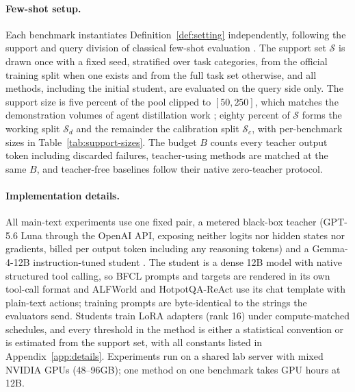 \paragraph{Few-shot setup.}
Each benchmark instantiates Definition~\ref{def:setting}
independently, following the support and query division of classical
few-shot evaluation \citep{vinyals2016matching, snell2017prototypical}.
The support set $\mathcal{S}$ is drawn once with a fixed seed,
stratified over task categories, from the official training split when
one exists and from the full task set otherwise, and all methods,
including the initial student, are evaluated on the query side only.
The support size is five percent of the pool clipped to $[50,250]$,
which matches the demonstration volumes of agent distillation work
\citep{kang2025distilling, liu2025structured}; eighty percent of
$\mathcal{S}$ forms the working split $\mathcal{S}_d$ and the
remainder the calibration split $\mathcal{S}_c$, with per-benchmark
sizes in Table~\ref{tab:support-sizes}. The budget $B$ counts every
teacher output token including discarded failures, teacher-using
methods are matched at the same $B$, and teacher-free baselines follow
their native zero-teacher protocol.

\paragraph{Implementation details.}
All main-text experiments use one fixed pair, a metered black-box
teacher (GPT-5.6 Luna through the OpenAI API, exposing neither logits nor
hidden states nor gradients, billed per output token including any
reasoning tokens) and a Gemma-4-12B instruction-tuned student
\citep{gemma4}. The student is a dense 12B model with native
structured tool calling, so BFCL prompts and targets are rendered in
its own tool-call format and ALFWorld and HotpotQA-ReAct use its chat template
with plain-text actions; training prompts are byte-identical to the
strings the evaluators send. Students train LoRA adapters (rank 16)
under compute-matched schedules, and every threshold in the method is
either a statistical convention or is estimated from the support set,
with all constants listed in Appendix~\ref{app:details}. Experiments
run on a shared lab server with mixed NVIDIA GPUs (48--96GB); one
method on one benchmark takes  GPU hours at 12B.
